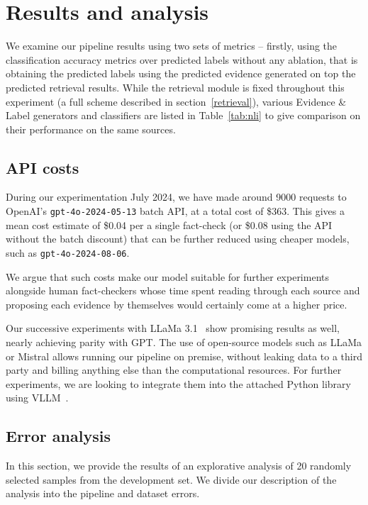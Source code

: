 
\section{Results and analysis}
\label{sec:results}

We examine our pipeline results using two sets of metrics -- firstly, using the classification accuracy metrics over predicted labels without any ablation, that is obtaining the predicted labels using the predicted evidence generated on top the predicted retrieval results. While the retrieval module is fixed throughout this experiment (a full scheme described in section~\ref{retrieval}), various Evidence \& Label generators and classifiers are listed in Table~\ref{tab:nli} to give comparison on their performance on the same sources.
\begin{table}[H]
    
\end{table}

\begin{table*}[h]
    
\end{table*}

\subsection{API costs}
During our experimentation July 2024, we have made around 9000 requests to OpenAI's \texttt{gpt-4o-2024-05-13} batch API, at a total cost of \$363.
This gives a mean cost estimate of \$0.04 per a single fact-check (or \$0.08 using the API without the batch discount) that can be further reduced using cheaper models, such as \texttt{gpt-4o-2024-08-06}.

We argue that such costs make our model suitable for further experiments alongside human fact-checkers whose time spent reading through each source and proposing each evidence by themselves would certainly come at a higher price.

Our successive experiments with LLaMa 3.1~\cite{meta2024llama31} show promising results as well, nearly achieving parity with GPT.
The use of open-source models such as LLaMa or Mistral allows running our pipeline on premise, without leaking data to a third party and billing anything else than the computational resources.
For further experiments, we are looking to integrate them into the attached Python library using VLLM~\cite{vllm}.

\subsection{Error analysis}
In this section, we provide the results of an explorative analysis of 20 randomly selected samples from the development set. We divide our description of the analysis into the pipeline and dataset errors.


